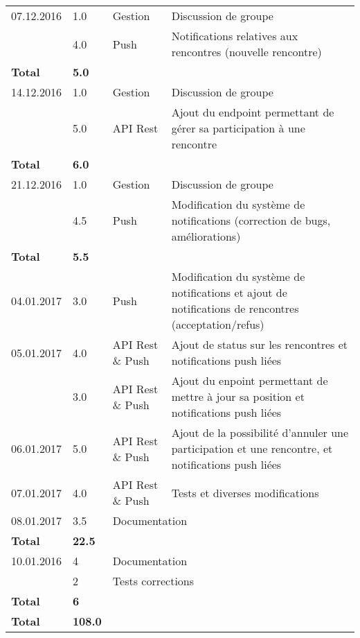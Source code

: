 \documentclass[french]{article}
\begin{document}
\begin{longtable}{p{}|p{}|p{}|p{}}
		\hline
		07.12.2016 & 1.0 & Gestion & Discussion de groupe \\
				   & 4.0 & Push & Notifications relatives aux rencontres (nouvelle rencontre) \\
		\textbf{Total} & \textbf{5.0} && \\

		\hline
		14.12.2016 & 1.0 & Gestion & Discussion de groupe \\
				   & 5.0 & API Rest & Ajout du endpoint permettant de gérer sa participation à une rencontre \\
		\textbf{Total} & \textbf{6.0} && \\

		\hline
		21.12.2016 & 1.0 & Gestion & Discussion de groupe \\
				   & 4.5 & Push & Modification du système de notifications (correction de bugs, améliorations) \\
	   \textbf{Total} & \textbf{5.5} && \\

		\hline
		04.01.2017 & 3.0 & Push & Modification du système de notifications et ajout de notifications de rencontres (acceptation/refus) \\
		05.01.2017 & 4.0 & API Rest \& Push & Ajout de status sur les rencontres et notifications push liées \\
				   & 3.0 & API Rest \& Push & Ajout du enpoint permettant de mettre à jour sa position et notifications push liées \\
		06.01.2017 & 5.0 & API Rest \& Push & Ajout de la possibilité d'annuler une participation et une rencontre, et notifications push liées \\
		07.01.2017 & 4.0 & API Rest \& Push & Tests et diverses modifications \\
		08.01.2017 & 3.5 & \multicolumn{2}{l}{Documentation} \\
		\textbf{Total} & \textbf{22.5} && \\
		\hline
		10.01.2016 & 4 & \multicolumn{2}{l}{Documentation} \\
	               & 2 & \multicolumn{2}{l}{Tests corrections} \\
		\textbf{Total} & \textbf{6} &&\\
		\hline
		\hline

		\textbf{Total} & \textbf{108.0} && \\

		\hline
	\end{longtable}
\end{document}
